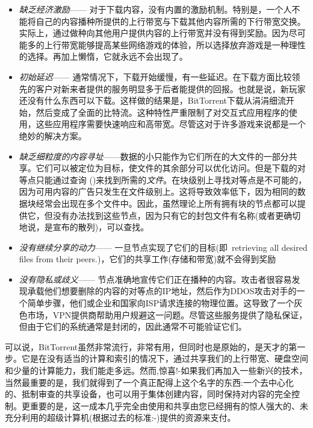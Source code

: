 \begin{itemize}
\item \emph{缺乏经济激励}——
对于下载内容，没有内置的激励机制。特别是，一个人不能将自己的内容播种所提供的上行带宽与下载其他内容所需的下行带宽交换。实际上，通过做种向其他用户提供内容的上行带宽并没有得到奖励。因为尽可能多的上行带宽能够提高某些网络游戏的体验，所以选择放弃游戏是一种理性的选择。再加上懒惰，它就永远不会出现了。

\item \emph{初始延迟}——
通常情况下，下载开始缓慢，有一些延迟。在下载方面比较领先的客户对新来者提供的服务明显多于后者能提供的回报。也就是说，新玩家还没有什么东西可以下载。这样做的结果是，BitTorrent下载从涓涓细流开始，然后变成了全面的比特流。这种特性严重限制了对交互式应用程序的使用，这些应用程序需要快速响应和高带宽。尽管这对于许多游戏来说都是一个绝妙的解决方案。
 
\item \emph{缺乏细粒度的内容寻址}——数据的小只能作为它们所在的大文件的一部分共享。它们可以被定位为目标，使文件的其余部分可以优化访问。但是下载的对等点只能通过查询 ()来找到所需的\emph{文件}。在块级别上寻找对等点是不可能的，因为可用内容的广告只发生在文件级别上。这将导致效率低下，因为相同的数据块经常会出现在多个文件中。因此，虽然理论上所有拥有块的节点都可以提供它，但没有办法找到这些节点，因为只有它的封包文件有名称(或者更确切地说，是宣布的散列)，可以查找。

\item \emph{没有继续分享的动力}——
一旦节点实现了它们的目标(即\ retrieving all desired files from their peers.)，它们的共享工作(存储和带宽)就不会得到奖励\item \emph{没有隐私或歧义}——
节点准确地宣传它们正在播种的内容。攻击者很容易发现承载他们想要删除的内容的对等点的IP地址，然后作为DDOS攻击对手的一个简单步骤，他们或企业和国家向ISP请求连接的物理位置。这导致了一个灰色市场，VPN提供商帮助用户规避这一问题。尽管这些服务提供了隐私保证，但由于它们的系统通常是封闭的，因此通常不可能验证它们。 
\end{itemize}

可以说，BitTorrent虽然非常流行，非常有用，但同时也是原始的，是天才的第一步。它是在没有适当的计算和索引的情况下，通过共享我们的上行带宽、硬盘空间和少量的计算能力，我们能走多远。然而,惊喜!-如果我们再加入一些新兴的技术，当然最重要的是，我们就得到了一个真正配得上这个名字的东西:一个去中心化的、抵制审查的共享设备，也可以用于集体创建内容，同时保持对内容的完全控制。更重要的是，这一成本几乎完全由使用和共享由您已经拥有的惊人强大的、未充分利用的超级计算机(根据过去的标准:-)提供的资源来支付。

